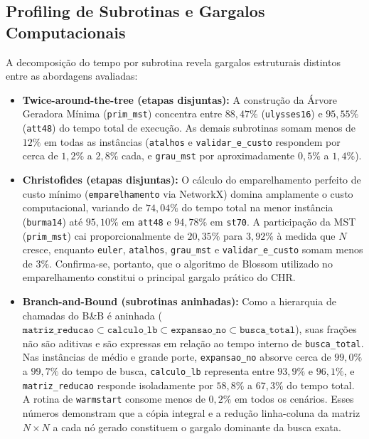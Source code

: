 \documentclass[12pt]{article}
\begin{document}
\subsection{Profiling de Subrotinas e Gargalos Computacionais}

A decomposição do tempo por subrotina revela gargalos estruturais distintos entre as abordagens avaliadas:
\begin{itemize}
    \item \textbf{Twice-around-the-tree (etapas disjuntas):} A construção da Árvore Geradora Mínima (\texttt{prim\_mst}) concentra entre $88{,}47\%$ (\texttt{ulysses16}) e $95{,}55\%$ (\texttt{att48}) do tempo total de execução. As demais subrotinas somam menos de $12\%$ em todas as instâncias (\texttt{atalhos} e \texttt{validar\_e\_custo} respondem por cerca de $1{,}2\%$ a $2{,}8\%$ cada, e \texttt{grau\_mst} por aproximadamente $0{,}5\%$ a $1{,}4\%$).
    \item \textbf{Christofides (etapas disjuntas):} O cálculo do emparelhamento perfeito de custo mínimo (\texttt{emparelhamento} via NetworkX) domina amplamente o custo computacional, variando de $74{,}04\%$ do tempo total na menor instância (\texttt{burma14}) até $95{,}10\%$ em \texttt{att48} e $94{,}78\%$ em \texttt{st70}. A participação da MST (\texttt{prim\_mst}) cai proporcionalmente de $20{,}35\%$ para $3{,}92\%$ à medida que $N$ cresce, enquanto \texttt{euler}, \texttt{atalhos}, \texttt{grau\_mst} e \texttt{validar\_e\_custo} somam menos de $3\%$. Confirma-se, portanto, que o algoritmo de Blossom utilizado no emparelhamento constitui o principal gargalo prático do CHR.
    \item \textbf{Branch-and-Bound (subrotinas aninhadas):} Como a hierarquia de chamadas do B\&B é aninhada ($\texttt{matriz\_reducao} \subset \texttt{calculo\_lb} \subset \texttt{expansao\_no} \subset \texttt{busca\_total}$), suas frações não são aditivas e são expressas em relação ao tempo interno de \texttt{busca\_total}. Nas instâncias de médio e grande porte, \texttt{expansao\_no} absorve cerca de $99{,}0\%$ a $99{,}7\%$ do tempo de busca, \texttt{calculo\_lb} representa entre $93{,}9\%$ e $96{,}1\%$, e \texttt{matriz\_reducao} responde isoladamente por $58{,}8\%$ a $67{,}3\%$ do tempo total. A rotina de \texttt{warmstart} consome menos de $0{,}2\%$ em todos os cenários. Esses números demonstram que a cópia integral e a redução linha-coluna da matriz $N \times N$ a cada nó gerado constituem o gargalo dominante da busca exata.
\end{itemize}
\end{document}
